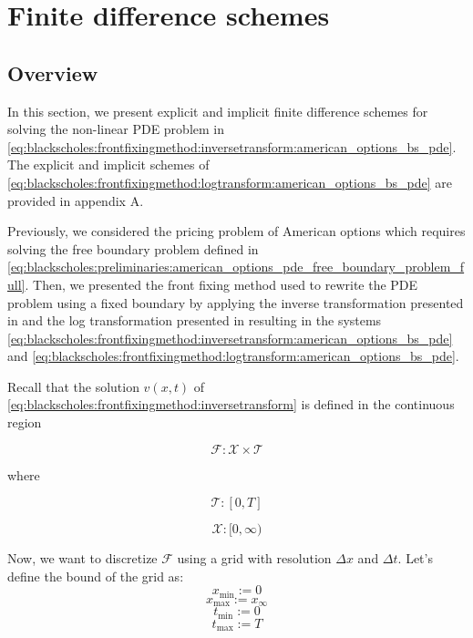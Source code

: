 
\section{Finite difference schemes}

\subsection{Overview}

In this section, we present explicit and implicit finite difference schemes
for solving the non-linear PDE problem in
\eqref{eq:blackscholes:frontfixingmethod:inversetransform:american_options_bs_pde}. 
The explicit and implicit schemes of \eqref{eq:blackscholes:frontfixingmethod:logtransform:american_options_bs_pde}
are provided in appendix A.

Previously, we  considered the pricing problem of American options which requires
solving the free boundary problem defined in 
\eqref{eq:blackscholes:preliminaries:american_options_pde_free_boundary_problem_full}.
Then, we presented the front fixing method used to rewrite the PDE problem using
a fixed boundary by applying the inverse transformation presented in \cite{nielsen_2001}
and the log transformation presented in \cite{company_egorova_jodar_2014} resulting
in the systems \eqref{eq:blackscholes:frontfixingmethod:inversetransform:american_options_bs_pde}
and \eqref{eq:blackscholes:frontfixingmethod:logtransform:american_options_bs_pde}. 

Recall that the solution $v(x,t)$ of 
\eqref{eq:blackscholes:frontfixingmethod:inversetransform} 
is defined in the continuous region 

\begin{equation*}
  \mathcal{F}: \mathcal{X} \times \mathcal{T}
\end{equation*}

where

\begin{equation*}
  \mathcal{T}: [0, T]
\end{equation*}

\begin{equation*}
   \mathcal{X}: [0, \infty)
\end{equation*}

Now, we want to discretize $\mathcal{F}$ using a grid with resolution $\Delta x$
and $\Delta t$. Let's define the bound of the grid as:
\begin{equation*}
  x_{\text{min}} := 0
\end{equation*}
\begin{equation*}
  x_{\text{max}} := x_{\infty}
\end{equation*}
\begin{equation*}
  t_{\text{min}} := 0 
\end{equation*}
\begin{equation*}
  t_{\text{max}} := T
\end{equation*}

